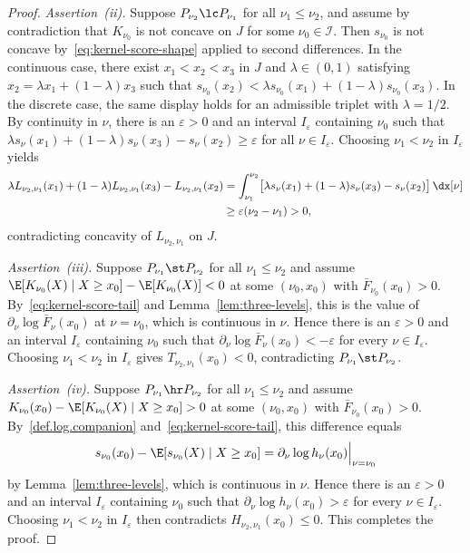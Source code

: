\documentclass[11pt]{article}
\begin{document}
\begin{proof}
\emph{Assertion~\textup{(ii)}.} Suppose \(P_{\nu_2}\lc P_{\nu_1}\) for all \(\nu_1\le\nu_2\), and assume by contradiction that \(K_{\nu_0}\) is not concave on \(J\) for some \(\nu_0 \in \mathcal I\). Then $s_{\nu_0}$ is not concave by~\eqref{eq:kernel-score-shape} applied to second differences. In the continuous case, there exist \(x_1<x_2<x_3\) in \(J\) and \(\lambda\in(0,1)\) satisfying \(x_2=\lambda x_1+(1-\lambda)x_3\) such that
\(s_{\nu_0}(x_2) <\lambda s_{\nu_0}(x_1)+(1-\lambda)s_{\nu_0}(x_3).\)
In the discrete case, the same display holds for an admissible triplet with \(\lambda=1/2\).
By continuity in \(\nu\), there is an \(\varepsilon>0\) and an interval $I_\varepsilon$ containing $\nu_0$ such that \(\lambda s_\nu(x_1)+(1-\lambda)s_\nu(x_3)-s_\nu(x_2)\ge\varepsilon\) for all \(\nu\in I_\varepsilon\). Choosing \(\nu_1<\nu_2\) in \(I_\varepsilon\) yields
\begin{alignat*}{2}
\lambda L_{\nu_2,\nu_1}(x_1) +(1-\lambda)L_{\nu_2,\nu_1}(x_3) -L_{\nu_2,\nu_1}(x_2)
&=\int_{\nu_1}^{\nu_2} \bigl[\lambda s_\nu(x_1)+(1-\lambda)s_\nu(x_3)-s_\nu(x_2)\bigr]\,\dx[\nu]\\
&\ge \varepsilon(\nu_2-\nu_1)>0,
\end{alignat*}
contradicting concavity of \(L_{\nu_2,\nu_1}\) on \(J\).

\emph{Assertion~\textup{(iii)}.} Suppose \(P_{\nu_1}\st P_{\nu_2}\) for all \(\nu_1\le\nu_2\) and assume \(\E[K_{\nu_0}(X)\mid X\ge x_0]-\E[K_{\nu_0}(X)]<0\) at some \((\nu_0,x_0)\) with \(\bar F_{\nu_0}(x_0)>0\). By~\eqref{eq:kernel-score-tail} and Lemma~\ref{lem:three-levels}, this is the value of $\partial_\nu\log\bar F_\nu(x_0)$ at $\nu=\nu_0$, which is continuous in $\nu$. Hence there is an \(\varepsilon>0\) and an interval \(I_\varepsilon\) containing \(\nu_0\) such that $\partial_\nu\log\bar F_\nu(x_0)<-\varepsilon$ for every $\nu\in I_\varepsilon$. Choosing \(\nu_1<\nu_2\) in \(I_\varepsilon\) gives $T_{\nu_2,\nu_1}(x_0)<0$, contradicting \(P_{\nu_1}\st P_{\nu_2}\).

\emph{Assertion~\textup{(iv)}.} Suppose \(P_{\nu_1}\hr P_{\nu_2}\) for all \(\nu_1\le\nu_2\) and assume \(K_{\nu_0}(x_0)-\E[K_{\nu_0}(X)\mid X\ge x_0]>0\) at some \((\nu_0,x_0)\) with \(\bar F_{\nu_0}(x_0)>0\). By~\eqref{def.log.companion} and~\eqref{eq:kernel-score-tail}, this difference equals
\[
s_{\nu_0}(x_0)-\E[s_{\nu_0}(X)\mid X\ge x_0]=\partial_\nu\log h_\nu(x_0)\Big|_{\nu=\nu_0}
\]
by Lemma~\ref{lem:three-levels}, which is continuous in $\nu$. Hence there is an \(\varepsilon>0\) and an interval \(I_\varepsilon\) containing \(\nu_0\) such that $\partial_\nu\log h_\nu(x_0)>\varepsilon$ for every $\nu\in I_\varepsilon$. Choosing \(\nu_1<\nu_2\) in \(I_\varepsilon\) then contradicts $H_{\nu_2,\nu_1}(x_0)\le 0$. This completes the proof.
\end{proof}
\end{document}
